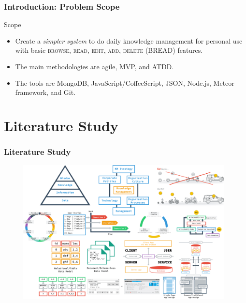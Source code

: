 \documentclass[10pt, compress]{beamer}
\begin{document}

\begin{frame}[fragile]
  \frametitle{Introduction: Problem Scope}

  \begin{block}{Scope}
    \begin{itemize} \itemsep0pt
      \item \alert{Create a \emph{simpler system}} to do daily knowledge management for personal use with \alert{basic \textsc{browse, read, edit, add, delete} (BREAD) features}.
      \item The main methodologies are agile, MVP, and ATDD.
      \item The tools are MongoDB, JavaScript/CoffeeScript, JSON, Node.js, Meteor framework, and Git.
    \end{itemize}
  \end{block}

\end{frame}


\section{Literature Study}


\begin{frame}
  \frametitle{Literature Study}

  \begin{figure}[ht]
    \vspace{-25pt}
    \centering
    \includegraphics[width=11cm]{include/literature-fundamentals.png}
    \label{fig:literature-fundamentals}
  \end{figure}

\end{frame}
\end{document}
